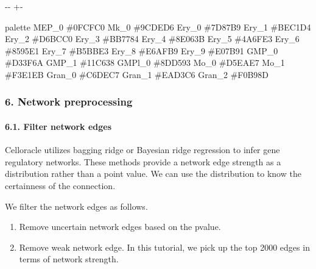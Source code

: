 \documentclass[letterpaper,10pt,english]{sphinxmanual}
\newlength\nbsphinxcodecellspacing
\begin{document}
{

\kern-\sphinxverbatimsmallskipamount\kern-\baselineskip
\kern+\FrameHeightAdjust\kern-\fboxrule
\vspace{\nbsphinxcodecellspacing}

\begin{sphinxVerbatim}[commandchars=\\\{\}]
\llap{\color{nbsphinxout}[76]:\,\hspace{\fboxrule}\hspace{\fboxsep}}        palette
MEP\_0   \#0FCFC0
Mk\_0    \#9CDED6
Ery\_0   \#7D87B9
Ery\_1   \#BEC1D4
Ery\_2   \#D6BCC0
Ery\_3   \#BB7784
Ery\_4   \#8E063B
Ery\_5   \#4A6FE3
Ery\_6   \#8595E1
Ery\_7   \#B5BBE3
Ery\_8   \#E6AFB9
Ery\_9   \#E07B91
GMP\_0   \#D33F6A
GMP\_1   \#11C638
GMPl\_0  \#8DD593
Mo\_0    \#D5EAE7
Mo\_1    \#F3E1EB
Gran\_0  \#C6DEC7
Gran\_1  \#EAD3C6
Gran\_2  \#F0B98D
\end{sphinxVerbatim}
}


\subsubsection{6. Network preprocessing}
\label{\detokenize{notebooks/04_Network_analysis/Network_analysis_with_Paul_etal_2015_data:6.-Network-preprocessing}}

\paragraph{6.1. Filter network edges}
\label{\detokenize{notebooks/04_Network_analysis/Network_analysis_with_Paul_etal_2015_data:6.1.-Filter-network-edges}}
Celloracle utilizes bagging ridge or Bayesian ridge regression to infer gene regulatory networks. These methods provide a network edge strength as a distribution rather than a point value. We can use the distribution to know the certainness of the connection.

We filter the network edges as follows.
\begin{enumerate}
%
\item {} 
Remove uncertain network edges based on the p\sphinxhyphen{}value.

\item {} 
Remove weak network edge. In this tutorial, we pick up the top 2000 edges in terms of network strength.

\end{enumerate}
\end{document}
